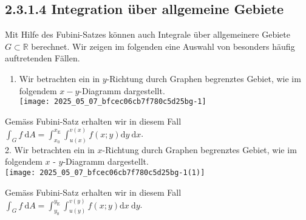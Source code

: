 \documentclass[10pt]{article}
\begin{document}
\subsection*{2.3.1.4 Integration über allgemeine Gebiete}
Mit Hilfe des Fubini-Satzes können auch Integrale über allgemeinere Gebiete $G \subset \mathbb{R}$ berechnet. Wir zeigen im folgenden eine Auswahl von besonders häufig auftretenden Fällen.

\begin{enumerate}
  \item Wir betrachten ein in $y$-Richtung durch Graphen begrenztes Gebiet, wie im folgendem $x-y$-Diagramm dargestellt.\\
\texttt{[image: 2025\_05\_07\_bfcec06cb7f780c5d25bg-1]}
\end{enumerate}

Gemäss Fubini-Satz erhalten wir in diesem Fall\\
$\int_{G} f \mathrm{~d} A=\int_{x_{0}}^{x_{\mathrm{E}}} \int_{u(x)}^{v(x)} f(x ; y) \mathrm{d} y \mathrm{~d} x$.\\
2. Wir betrachten ein in $x$-Richtung durch Graphen begrenztes Gebiet, wie im folgendem $x$ - $y$-Diagramm dargestellt.\\
\texttt{[image: 2025\_05\_07\_bfcec06cb7f780c5d25bg-1(1)]}

Gemäss Fubini-Satz erhalten wir in diesem Fall $\int_{G} f \mathrm{~d} A=\int_{y_{0}}^{y_{\mathrm{E}}} \int_{u(y)}^{v(y)} f(x ; y) \mathrm{d} x \mathrm{~d} y$.
\end{document}
